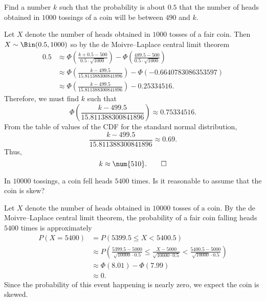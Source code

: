\begin{problem}[Handout 14, \# 12]
  Find a number \(k\) such that the probability is about \(0.5\) that the
  number of heads obtained in \(\num{1000}\) tossings of a coin will be
  between \(490\) and \(k\).
\end{problem}
\begin{solution}
  Let \(X\) denote the number of heads obtained in \(1000\) tosses of a
  fair coin. Then \(X\sim\Bin(0.5,1000)\) so by the de Moivre--Laplace
  central limit theorem
  \begin{align*}
    0.5&\approx\Phi\left(\frac{k+0.5-500}{0.5\cdot \sqrt{1000}}\right)
         -\Phi\left(\frac{489.5-500}{0.5\cdot\sqrt{1000}}\right)\\
       &\approx\Phi\left(\frac{k-499.5}{\num{15.811388300841896}}\right)
         -\Phi(-\num{0.6640783086353597})\\
       &\approx\Phi\left(\frac{k-499.5}{\num{15.811388300841896}}\right)
         -\num{0.25334516}.
  \end{align*}
  Therefore, we must find \(k\) such that
  \[
    \Phi\left(\frac{k-499.5}{\num{15.811388300841896}}\right)\approx
    \num{0.75334516}.
  \]
  From the table of values of the CDF for the standard normal distribution,
  \[
    \frac{k-499.5}{\num{15.811388300841896}}\approx 0.69.
  \]
  Thus,
  \[
    k\approx\num{510}.\qedhere
  \]
\end{solution}
\newpage

\begin{problem}[Handout 14, \# 13]
  In \(\num{10000}\) tossings, a coin fell heads \(\num{5400}\) times. Is
  it reasonable to assume that the coin is skew?
\end{problem}
\begin{solution}
  Let \(X\) denote the number of heads obtained in \(\num{10000}\) tosses
  of a coin. By the de Moivre--Laplace central limit theorem, the
  probability of a fair coin falling heads \(\num{5400}\) times is
  approximately
  \begin{align*}
    P(X=\num{5400})
    &=P(\num{5399.5}\leq X<\num{5400.5})\\
    &\approx P
      \left(\frac{5399.5-5000}{\sqrt{\num{10000}}\cdot 0.5}\leq
      \frac{X-5000}{\sqrt{\num{10000}\cdot 0.5}}<
      \frac{5400.5-5000}{\sqrt{\num{10000}}\cdot 0.5}\right)\\
    &\approx\Phi(8.01)-\Phi(7.99)\\
    &\approx 0.
  \end{align*}
  Since the probability of this event happening is nearly zero, we expect
  the coin is skewed.
\end{solution}
\newpage

